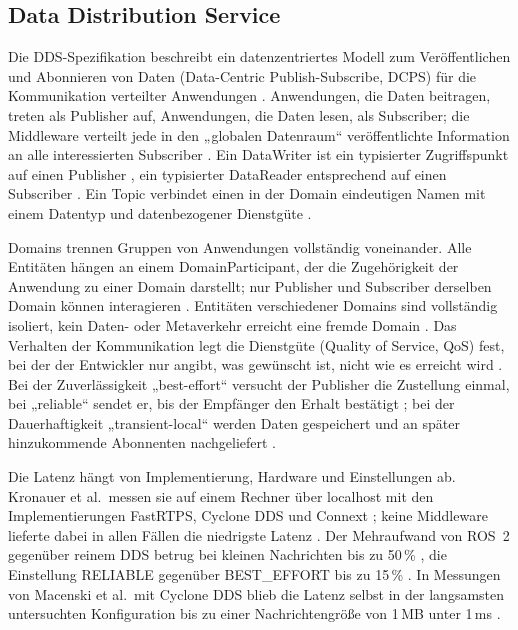 \subsection{Data Distribution Service}
\label{sec:dds}
Die DDS-Spezifikation beschreibt ein datenzentriertes Modell zum Veröffentlichen und Abonnieren von Daten (Data-Centric Publish-Subscribe, DCPS) für die Kommunikation verteilter Anwendungen \cite{OMG2015}.
Anwendungen, die Daten beitragen, treten als Publisher auf, Anwendungen, die Daten lesen, als Subscriber; die Middleware verteilt jede in den „globalen Datenraum“ veröffentlichte Information an alle interessierten Subscriber \cite{OMG2015}.
Ein DataWriter ist ein typisierter Zugriffspunkt auf einen Publisher \cite{OMG2015}, ein typisierter DataReader entsprechend auf einen Subscriber \cite{OMG2015}.
Ein Topic verbindet einen in der Domain eindeutigen Namen mit einem Datentyp und datenbezogener Dienstgüte \cite{OMG2015}.

Domains trennen Gruppen von Anwendungen vollständig voneinander.
Alle Entitäten hängen an einem DomainParticipant, der die Zugehörigkeit der Anwendung zu einer Domain darstellt; nur Publisher und Subscriber derselben Domain können interagieren \cite{OMG2015}.
Entitäten verschiedener Domains sind vollständig isoliert, kein Daten- oder Metaverkehr erreicht eine fremde Domain \cite{OMG2015}.
Das Verhalten der Kommunikation legt die Dienstgüte (Quality of Service, QoS) fest, bei der der Entwickler nur angibt, was gewünscht ist, nicht wie es erreicht wird \cite{OMG2015}.
Bei der Zuverlässigkeit „best-effort“ versucht der Publisher die Zustellung einmal, bei „reliable“ sendet er, bis der Empfänger den Erhalt bestätigt \cite{Macenski2022}; bei der Dauerhaftigkeit „transient-local“ werden Daten gespeichert und an später hinzukommende Abonnenten nachgeliefert \cite{Macenski2022}.

Die Latenz hängt von Implementierung, Hardware und Einstellungen ab.
Kronauer et al.\ messen sie auf einem Rechner über localhost mit den Implementierungen FastRTPS, Cyclone DDS und Connext \cite{Kronauer2021}; keine Middleware lieferte dabei in allen Fällen die niedrigste Latenz \cite{Kronauer2021}.
Der Mehraufwand von ROS~2 gegenüber reinem DDS betrug bei kleinen Nachrichten bis zu 50\,\% \cite{Kronauer2021}, die Einstellung RELIABLE gegenüber BEST\_EFFORT bis zu 15\,\% \cite{Kronauer2021}.
In Messungen von Macenski et al.\ mit Cyclone DDS blieb die Latenz selbst in der langsamsten untersuchten Konfiguration bis zu einer Nachrichtengröße von 1\,MB unter 1\,ms \cite{Macenski2022}.

